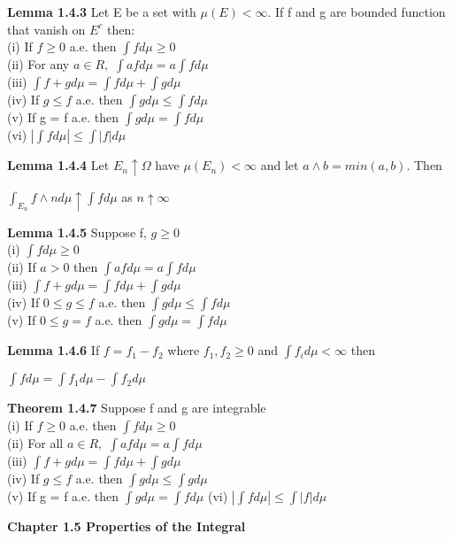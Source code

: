 \documentclass{article}
\newcommand\tab[1][1cm]{\hspace*{#1}}
\begin{document}
\textbf {Lemma 1.4.3} Let E be a set with $\mu(E) < \infty$. If f and g are bounded function that vanish on $E^c$ then: \\
(i) If $f \geq 0$ a.e. then $\int f d\mu \geq 0$ \\
(ii) For any $a \in R,$  $\int a f d\mu = a \int f d\mu$ \\
(iii) $\int f + g d\mu = \int f d\mu + \int g d\mu$ \\
(iv) If $g \leq f$ a.e. then $\int g d\mu \leq \int f d\mu$ \\
(v) If g = f a.e. then $\int g d\mu = \int f d\mu$ \\
(vi) $| \int f d\mu | \leq \int |f| d\mu$

\textbf {Lemma 1.4.4} Let $E_n \uparrow \Omega$ have $\mu (E_n) < \infty$ and let $a \land b = min(a,b)$. Then 
\begin{center}
$\int_{E_n} f \land n d\mu \uparrow \int f d\mu$ \tab as $n \uparrow \infty$
\end{center}

\textbf {Lemma 1.4.5} Suppose f, $g \geq 0$ \\
(i) $\int f d\mu \geq 0$ \\
(ii) If $a > 0$ then $\int a f d\mu = a \int f d\mu$ \\
(iii) $\int f + g d\mu = \int f d\mu + \int g d\mu$ \\
(iv) If $0 \leq g \leq f$ a.e. then $\int g d\mu \leq \int f d\mu$ \\
(v) If $0 \leq g = f$ a.e. then $\int g d\mu = \int f d\mu$

\textbf {Lemma 1.4.6} If $f = f_1 - f_2$ where $f_1, f_2 \geq 0$ and $\int f_i d\mu < \infty$ then
\begin{center}
$\int f d\mu = \int f_1 d\mu - \int f_2 d\mu$
\end{center}

\textbf {Theorem 1.4.7} Suppose f and g are integrable \\
(i) If $f \geq 0$ a.e. then $\int f d\mu \geq 0$ \\
(ii) For all $a \in R,$  $\int a f d\mu = a \int f d\mu$ \\
(iii) $\int f + g d\mu = \int f d\mu + \int g d\mu$ \\
(iv) If $g \leq f$ a.e. then $\int g d\mu \leq \int g d\mu$ \\
(v) If g = f a.e. then $\int g d\mu = \int f d\mu$
(vi) $| \int f d\mu | \leq \int |f| d\mu$

\textbf {Chapter 1.5 Properties of the Integral}
\end{document}
